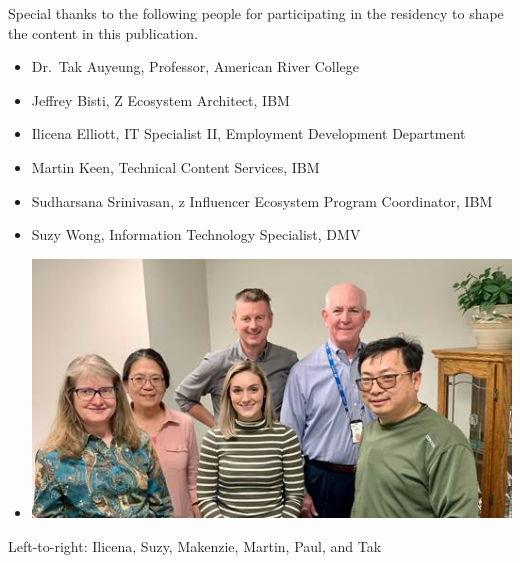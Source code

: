 Special thanks to the following people for participating in the
residency to shape the content in this publication.

\begin{itemize}
\item
  Dr.~Tak Auyeung, Professor, American River College
\item
  Jeffrey Bisti, Z Ecosystem Architect, IBM
\item
  Ilicena Elliott, IT Specialist II, Employment Development Department
\item
  Martin Keen, Technical Content Services, IBM
\item
  Sudharsana Srinivasan, z Influencer Ecosystem Program Coordinator, IBM
\item
  Suzy Wong, Information Technology Specialist, DMV
\item
  \includegraphics{Images/image004.jpg}
\end{itemize}

Left-to-right: Ilicena, Suzy, Makenzie, Martin, Paul, and Tak
\pagebreak